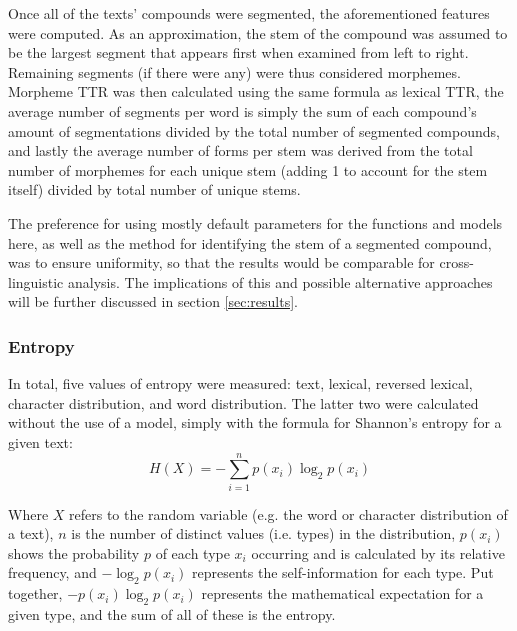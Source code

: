 \documentclass[12pt,a4paper]{article}
\numberwithin{figure}{section}
\numberwithin{table}{section}
\numberwithin{definition}{section}
\begin{document}


Once all of the texts' compounds were segmented, the aforementioned features were computed. As an approximation, the stem of the compound was assumed to be the largest segment that appears first when examined from left to right. Remaining segments (if there were any) were thus considered morphemes. Morpheme TTR was then calculated using the same formula as lexical TTR, the average number of segments per word is simply the sum of each compound's amount of segmentations divided by the total number of segmented compounds, and lastly the average number of forms per stem was derived from the total number of morphemes for each unique stem (adding 1 to account for the stem itself) divided by total number of unique stems.

The preference for using mostly default parameters for the functions and models here, as well as the method for identifying the stem of a segmented compound, was to ensure uniformity, so that the results would be comparable for cross-linguistic analysis. The implications of this and possible alternative approaches will be further discussed in section \ref{sec:results}.

\subsubsection{Entropy}
\label{ssec:entropy}

In total, five values of entropy were measured: text, lexical, reversed lexical, character distribution, and word distribution. The latter two were calculated without the use of a model, simply with the formula for Shannon's entropy for a given text: \[H(X) = -\sum_{i=1}^{n}p(x_i)\log_{2}p(x_i)\]

Where \( X \) refers to the random variable (e.g. the word or character distribution of a text), \( n \) is the number of distinct values (i.e. types) in the distribution, \( p(x_i) \) shows the probability \( p \) of each type \( x_i \) occurring and is calculated by its relative frequency, and \( -\log_{2}p(x_i) \) represents the self-information for each type. Put together, \( -p(x_i)\log_{2}p(x_i) \) represents the mathematical expectation for a given type, and the sum of all of these is the entropy.
\end{document}
